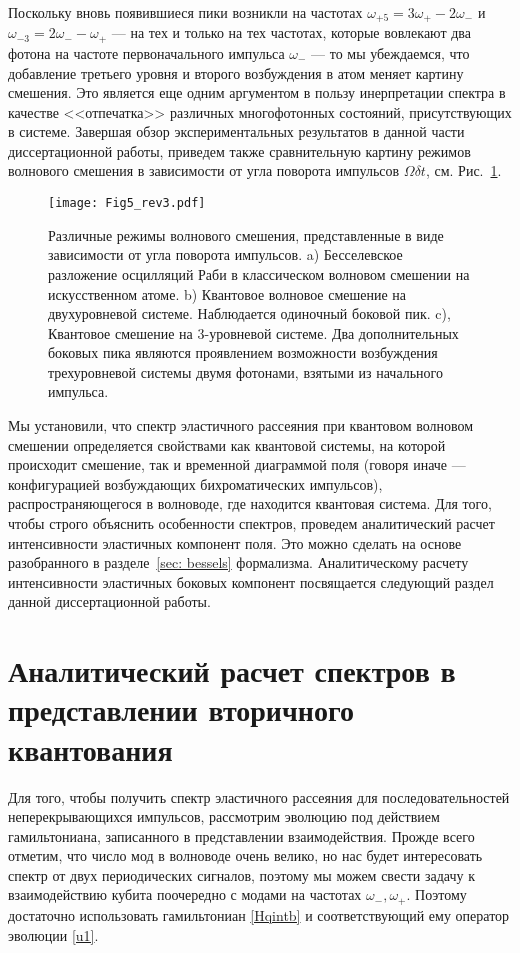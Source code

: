 Поскольку вновь появившиеся пики возникли на частотах $\omega_{+5} = 3\omega_+-2\omega_-$ и $\omega_{-3} = 2\omega_--\omega_+$ --- на тех и только на тех частотах, которые вовлекают два фотона на частоте первоначального импульса $\omega_-$ --- то мы убеждаемся, что добавление третьего уровня и второго возбуждения в атом меняет картину смешения. Это является еще одним аргументом в пользу инерпретации спектра в качестве <<отпечатка>> различных многофотонных состояний, присутствующих в системе. Завершая обзор экспериментальных результатов в данной части диссертационной работы, приведем также сравнительную картину режимов волнового смешения в зависимости от угла поворота импульсов $\Omega\delta t$, см. Рис.~\ref{fig: qwm_all}. 
\begin{figure}
	\centering
	\texttt{[image: Fig5\_rev3.pdf]}
	\caption[Сравнение различных режимов волнового смешения]{Различные режимы волнового смешения, представленные в виде зависимости от угла поворота импульсов. a) Бесселевское разложение осцилляций Раби в классическом волновом смешении на искусственном атоме. b) Квантовое волновое смешение на двухуровневой системе. Наблюдается одиночный боковой пик. c), Квантовое смешение на 3-уровневой системе. Два дополнительных боковых пика являются проявлением возможности возбуждения трехуровневой системы двумя фотонами, взятыми из начального импульса. }
	\label{fig: qwm_all}
\end{figure}
Мы установили, что спектр эластичного рассеяния при квантовом волновом смешении определяется свойствами как квантовой системы, на которой происходит смешение, так и временной диаграммой поля (говоря иначе --- конфигурацией возбуждающих бихроматических импульсов), распространяющегося в волноводе, где находится квантовая система. Для того, чтобы строго объяснить особенности спектров, проведем аналитический расчет интенсивности эластичных компонент поля. Это можно сделать на основе разобранного в разделе~\ref{sec: bessels} формализма. Аналитическому расчету интенсивности эластичных боковых компонент посвящается следующий раздел данной диссертационной работы.  
\section{Аналитический расчет спектров в представлении вторичного квантования}
Для того, чтобы получить спектр эластичного рассеяния для последовательностей неперекрывающихся импульсов, рассмотрим эволюцию под действием гамильтониана, записанного в представлении взаимодействия. Прожде всего отметим, что число мод в волноводе очень велико, но нас будет интересовать спектр от двух периодических сигналов, поэтому мы можем свести задачу к взаимодействию кубита поочередно с модами на частотах $\omega_-, \omega_+$. Поэтому достаточно использовать гамильтониан \eqref{Hqintb} и соответствующий ему оператор эволюции \eqref{u1}. 
